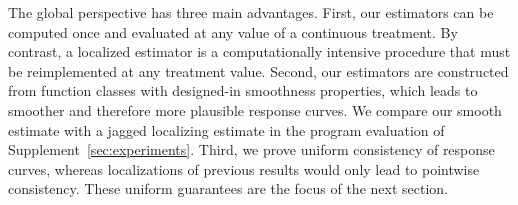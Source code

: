 The global perspective has three main advantages. First, our estimators can be computed once and evaluated at any value of a continuous treatment.  By contrast, a localized estimator is a computationally intensive procedure that must be reimplemented at any treatment value. Second, our estimators are constructed from function classes with designed-in smoothness properties, which leads to smoother and therefore more plausible response curves. We compare our smooth estimate with a jagged localizing estimate in the program evaluation of Supplement~\ref{sec:experiments}. Third, we prove uniform consistency of response curves, whereas localizations of previous results would only lead to pointwise consistency. These uniform guarantees are the focus of the next section.
